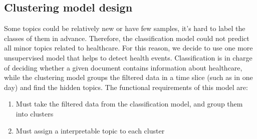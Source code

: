\subsection{Clustering model design}
Some topics could be relatively new or have few samples, it's hard to label the classes of them in advance. Therefore, the classification model could not predict all minor topics related to healthcare. For this reason, we decide to use one more unsupervised model that helps to detect health events. Classification is in charge of deciding whether a given document contains information about healthcare, while the clustering model groups the filtered data in a time slice (such as in one day) and find the hidden topics. The functional requirements of this model are:
\begin{enumerate}
    \item Must take the filtered data from the classification model, and group them into clusters
    \item Must assign a interpretable topic to each cluster
\end{enumerate}

